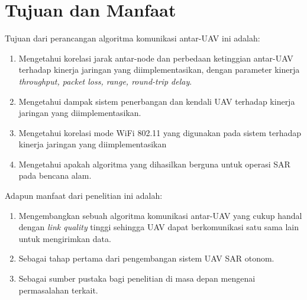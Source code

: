 \section{Tujuan dan Manfaat}
Tujuan dari perancangan algoritma komunikasi antar-UAV ini adalah:
\begin{enumerate}
	\item Mengetahui korelasi jarak antar-node dan perbedaan ketinggian antar-UAV terhadap kinerja jaringan yang diimplementasikan, dengan parameter kinerja \textit{throughput, packet loss, range, round-trip delay}.
	\item Mengetahui dampak sistem penerbangan dan kendali UAV terhadap kinerja jaringan yang diimplementasikan.
	\item Mengetahui korelasi mode WiFi 802.11 yang digunakan pada sistem terhadap kinerja jaringan yang diimplementasikan
	\item Mengetahui apakah algoritma yang dihasilkan berguna untuk operasi SAR pada bencana alam.
\end{enumerate}
Adapun manfaat dari penelitian ini adalah:
\begin{enumerate}
	\item Mengembangkan sebuah algoritma komunikasi antar-UAV yang cukup handal dengan \textit{link quality} tinggi sehingga UAV dapat berkomunikasi satu sama lain untuk mengirimkan data.
	\item Sebagai tahap pertama dari pengembangan sistem UAV SAR otonom.
	\item Sebagai sumber pustaka bagi penelitian di masa depan mengenai permasalahan terkait.
\end{enumerate}

